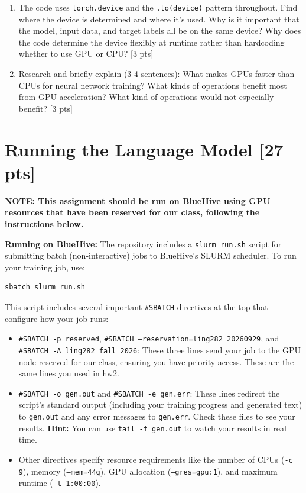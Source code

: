 \documentclass[11pt]{article}
\begin{document}
\vspace{2em}
\begin{enumerate}[label=\alph*., itemsep=2em]
  \item The code uses \texttt{torch.device} and the \texttt{.to(device)} pattern throughout. Find where the device is determined and where it's used. Why is it important that the model, input data, and target labels all be on the same device? Why does the code determine the device flexibly at runtime rather than hardcoding whether to use GPU or CPU? [3 pts]
  \item Research and briefly explain (3-4 sentences): What makes GPUs faster than CPUs for neural network training? What kinds of operations benefit most from GPU acceleration? What kind of operations would not especially benefit? [3 pts]
\end{enumerate}

\newpage
\section{Running the Language Model [27 pts]}

\textbf{NOTE: This assignment should be run on BlueHive using GPU resources that have been reserved for our class, following the instructions below.}

\vspace{1em}
\noindent \textbf{Running on BlueHive:} The repository includes a \texttt{slurm\_run.sh} script for submitting batch (non-interactive) jobs to BlueHive's SLURM scheduler. To run your training job, use:
\begin{verbatim}
sbatch slurm_run.sh
\end{verbatim}

\noindent This script includes several important \texttt{\#SBATCH} directives at the top that configure how your job runs:
\begin{itemize}
  \item \texttt{\#SBATCH -p reserved}, \texttt{\#SBATCH --reservation=ling282\_20260929}, and \texttt{\#SBATCH -A ling282\_fall\_2026}: These three lines send your job to the GPU node reserved for our class, ensuring you have priority access. These are the same lines you used in hw2.
  \item \texttt{\#SBATCH -o gen.out} and \texttt{\#SBATCH -e gen.err}: These lines redirect the script's standard output (including your training progress and generated text) to \texttt{gen.out} and any error messages to \texttt{gen.err}. Check these files to see your results. \textbf{Hint:} You can use \texttt{tail -f gen.out} to watch your results in real time.
  \item Other directives specify resource requirements like the number of CPUs (\texttt{-c 9}), memory (\texttt{--mem=44g}), GPU allocation (\texttt{--gres=gpu:1}), and maximum runtime (\texttt{-t 1:00:00}).
\end{itemize}
\end{document}
